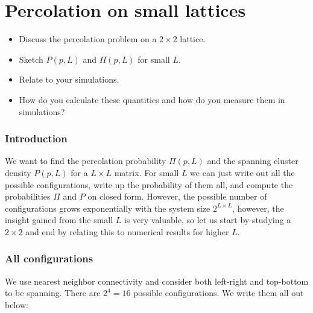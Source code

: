 \documentclass[a4paper, 11pt, notitlepage, english]{article}
\begin{document}
\clearpage

\section{Percolation on small lattices}
\begin{itemize}
	\item Discuss the percolation problem on a $2\times 2$ lattice.
	\item Sketch $P(p, L)$ and $\Pi(p, L)$ for small $L$.
	\item Relate to your simulations.
	\item How do you calculate these quantities and how do you measure them in simulations?
\end{itemize}

   

\subsubsection*{Introduction}

We want to find the percolation probability $\Pi(p, L)$ and the spanning cluster density $P(p, L)$ for a $L\times L$ matrix. For small $L$ we can just write out all the possible configurations, write up the probability of them all, and compute the probabilities $\Pi$ and $P$ on closed form. However, the possible number of configurations grows exponentially with the system size $2^{L\times L}$, however, the insight gained from the small $L$ is very valuable, so let us start by studying a $2\times 2$ and end by relating this to numerical results for higher $L$.


\subsubsection*{All configurations}
We use nearest neighbor connectivity and consider both left-right and top-bottom to be spanning. There are $2^4 = 16$ possible configurations. We write them all out below:
\end{document}
